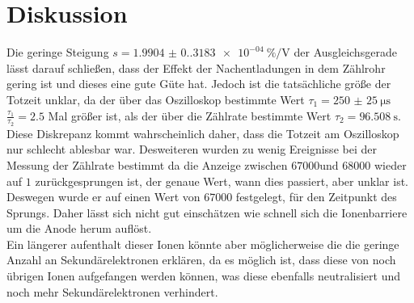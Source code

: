 \section{Diskussion}

Die geringe Steigung $s=\qty{1.9904(0.3183)e-04}{\percent\per\volt}$ der Ausgleichsgerade lässt darauf schließen, dass 
der Effekt der Nachentladungen in dem  Zählrohr gering ist und dieses eine gute Güte hat. Jedoch ist die tatsächliche 
größe der Totzeit unklar, da der über das Oszilloskop bestimmte Wert $\tau_1=\qty{250(25)}{\micro\second}$ 
$\frac{\tau_1}{\tau_2}=2.5$ Mal größer  ist, als der über die Zählrate bestimmte Wert $\tau_2=\qty{96.508}{\second}$.
Diese Diskrepanz kommt wahrscheinlich daher, dass die Totzeit am Oszilloskop nur schlecht ablesbar war.
Desweiteren wurden zu wenig Ereignisse bei der Messung der Zählrate bestimmt da die Anzeige zwischen $67000 \text{und }
68000$ wieder auf $1$ zurückgesprungen ist, der genaue Wert, wann dies passiert, aber unklar ist. Deswegen wurde er auf
einen Wert von $67000$ festgelegt, für den Zeitpunkt des Sprungs.
Daher lässt sich nicht gut einschätzen wie schnell sich die Ionenbarriere um die Anode herum auflöst. \\

\noindent Ein längerer aufenthalt dieser Ionen könnte aber möglicherweise die die geringe Anzahl an Sekundärelektronen 
erklären, da es möglich ist, dass diese von noch übrigen Ionen aufgefangen werden können, was diese ebenfalls 
neutralisiert und noch mehr Sekundärelektronen verhindert.

\label{sec:Diskussion}
